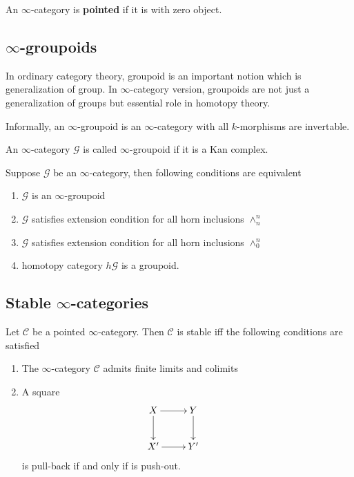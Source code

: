 \begin{mydefn}
  An $\infty$-category is \textbf{pointed} if it is with zero object.
\end{mydefn}

\subsection{$\infty$-groupoids}
In ordinary category theory, groupoid is an important notion which is generalization of group. In $\infty$-category version, groupoids are not just a generalization of groups but essential role in homotopy theory.
\par
Informally, an $\infty$-groupoid is an $\infty$-category with all $k$-morphisms are invertable.
\begin{mydefn}
  An $\infty$-category $\mathcal{G}$ is called $\infty$-groupoid if it is a Kan complex.
\end{mydefn}
\begin{prop}[Joyal]
  Suppose $\mathcal{G}$ be an $\infty$-category, then following conditions are equivalent
  \begin{enumerate}
    \item $\mathcal{G}$ is an $\infty$-groupoid
    \item $\mathcal{G}$ satisfies extension condition for all horn inclusions $\wedge^{n}_n$
    \item $\mathcal{G}$ satisfies extension condition for all horn inclusions $\wedge^{n}_0$
    \item homotopy category $h \mathcal{G}$ is a groupoid.
  \end{enumerate}
\end{prop}

\subsection{Stable $\infty$-categories}
\begin{prop}
  Let $\mathcal{C}$ be a pointed $\infty$-category. Then $\mathcal{C}$ is stable iff the following conditions are satisfied
\begin{enumerate}
  \item The $\infty$-category $\mathcal{C}$ admits finite limits and colimits
  \item A square
  \[
  \xymatrix{
  X \ar[r] \ar[d]&Y \ar[d]&\\
  X' \ar[r] &Y'&
  }
  \]
  is pull-back if and only if is push-out.
\end{enumerate}
\end{prop}
